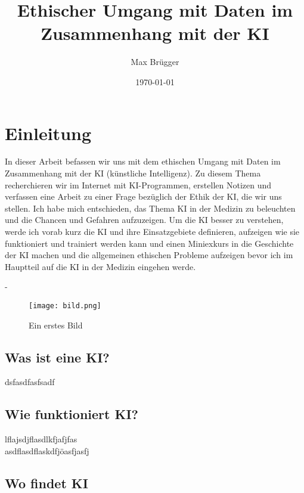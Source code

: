 \documentclass{report}
\title{Ethischer Umgang mit Daten im Zusammenhang mit der KI}
\author{Max Brügger}
\date{\today}
\newcommand{\zitieren}[1]{ - \citeauthor{#1} \citeyear{#1}}
\begin{document}
\maketitle

\tableofcontents

\section{Einleitung}

In dieser Arbeit befassen wir uns mit dem ethischen Umgang mit Daten im Zusammenhang mit der KI (künstliche Intelligenz). Zu diesem Thema  recherchieren wir im Internet mit KI-Programmen, erstellen Notizen und verfassen eine Arbeit zu einer Frage bezüglich der Ethik der KI, die wir uns stellen. Ich habe mich entschieden, das Thema KI in der Medizin zu beleuchten und die Chancen und Gefahren aufzuzeigen. 
Um die KI  besser zu verstehen, werde ich vorab kurz die KI und ihre Einsatzgebiete definieren, aufzeigen wie sie funktioniert und trainiert werden kann und einen Miniexkurs in die Geschichte der KI machen und die allgemeinen ethischen Probleme aufzeigen bevor ich im Hauptteil auf die KI in der Medizin eingehen werde.\parencite{ai-wikipedia}

\zitieren{ai-wikipedia}

\begin{figure}
    \centering
    \texttt{[image: bild.png]}
    \caption{Ein erstes Bild}
\end{figure}



\subsection{Was ist eine KI?}
dsfasdfasfsadf

\subsection{Wie funktioniert KI?}
lflajsdjflasdlkfjafjfas\\
asdflasdflaskdfjöasfjasfj



\subsection{Wo findet KI}

\nocite{*}
\printbibliography
\end{document}
